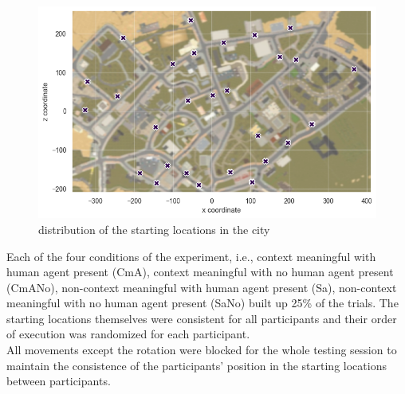 \begin{figure}[h]
	\raggedright
	\includegraphics[width=140mm]{figures/starting_locations_map_color.png}
	\caption[Distribution of starting locations]{distribution of the starting locations in the city}
	\label{fig:starting_locs}
\end{figure}

Each of the four conditions of the experiment, i.e., context meaningful with human agent present {\emphasize(CmA)}, context meaningful with no human agent present {\emphasize(CmANo)}, non-context meaningful with human agent present {\emphasize(Sa)}, non-context meaningful with no human agent present {\emphasize(SaNo)} built up 25\% of the trials.  The starting locations themselves were consistent for all participants and their order of execution was randomized for each participant. \\
All movements except the rotation were blocked for the whole testing session to maintain the consistence of the participants' position in the starting locations between participants. 


